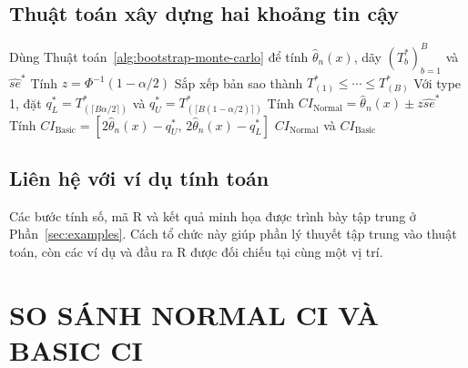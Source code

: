\documentclass[12pt,a4paper]{article}
\theoremstyle{definition}
\numberwithin{equation}{section}
\begin{document}
	\subsection{Thuật toán xây dựng hai khoảng tin cậy}
	\begin{algorithm}[H]
        Dùng Thuật toán~\ref{alg:bootstrap-monte-carlo} để tính
        $\hat\theta_n(x)$, dãy $(T_b^*)_{b=1}^B$ và $\widehat{se}^*$\;
        Tính $z=\Phi^{-1}(1-\alpha/2)$\;
        Sắp xếp bản sao thành $T_{(1)}^*\le\cdots\le T_{(B)}^*$\;
        Với type 1, đặt $q_L^*=T_{(\lceil B\alpha/2\rceil)}^*$ và
        $q_U^*=T_{(\lceil B(1-\alpha/2)\rceil)}^*$\;
        Tính $CI_{\text{Normal}}=\hat\theta_n(x)\pm z\widehat{se}^*$\;
        Tính $CI_{\text{Basic}}=[2\hat\theta_n(x)-q_U^*,\,2\hat\theta_n(x)-q_L^*]$\;
        \Return $CI_{\text{Normal}}$ và $CI_{\text{Basic}}$\;
        \caption{Xây dựng khoảng Normal CI và Basic CI}
    \end{algorithm}

    \subsection{Liên hệ với ví dụ tính toán}

Các bước tính số, mã R và kết quả minh họa được trình bày tập trung ở
Phần~\ref{sec:examples}. Cách tổ chức này giúp phần lý thuyết tập trung vào
thuật toán, còn các ví dụ và đầu ra R được đối chiếu tại cùng một vị trí.


\newpage
\section{SO SÁNH NORMAL CI VÀ BASIC CI}
\end{document}

